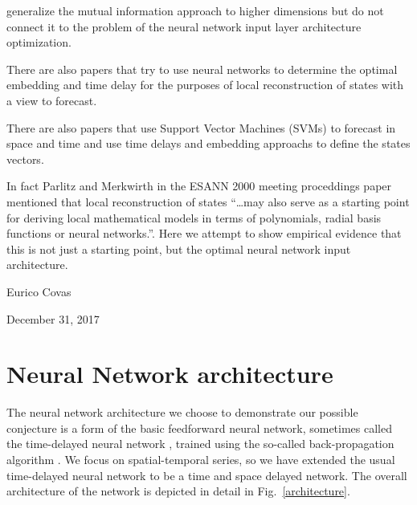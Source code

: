 \documentclass[journal]{IEEEtran}
\begin{document}
\cite{Simon:2007:HDS:1230147.1230294} generalize the mutual information approach to higher dimensions but do not connect it to the problem of the
neural network input layer architecture optimization.

There are also papers \cite{articleRagulskis} that try to use neural networks to determine the optimal embedding and time delay for the purposes of local
reconstruction of states with a view to forecast.

There are also papers \cite{Xia2006APF} that use Support Vector Machines (SVMs) to forecast in space and time and use time delays and embedding approachs to define
the states vectors.

In fact Parlitz and Merkwirth \cite{Parlitz2000NonlinearPO} in the
ESANN 2000 meeting proceddings paper mentioned that local reconstruction of states ``\ldots may also serve as
a starting point for deriving local mathematical models in terms of polynomials,
radial basis functions or neural networks.''. Here we attempt to show empirical evidence that this is not just
a starting point, but the optimal neural network input architecture.

\hfill Eurico Covas

\hfill December 31, 2017

\section{Neural Network architecture}

The neural network architecture we choose to demonstrate our possible conjecture is a form of the basic feedforward neural network,
sometimes called the time-delayed neural network \cite{Waibel:1990:PRU:108235.108263}, trained using the so-called back-propagation
algorithm \cite{10.1007/BFb0006203, 1986Natur.323..533R, 58337}. We focus on spatial-temporal series, so we have extended the usual time-delayed neural network
to be a time and space delayed network. The overall architecture of the network is depicted in detail in Fig.\ \ref{architecture}.
\end{document}
